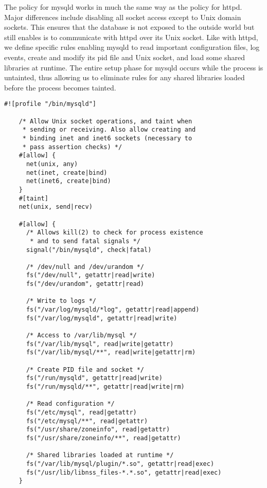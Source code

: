 The \bpfbox{} policy for mysqld works in much the same way as the policy for httpd. Major
differences include disabling all socket access except to Unix domain sockets. This
ensures that the database is not exposed to the outside world but still enables is to
communicate with httpd over its Unix socket. Like with httpd, we define specific rules
enabling mysqld to read important configuration files, log events, create and modify its
\gls{pid} file and Unix socket, and load some shared libraries at runtime. The entire
setup phase for mysqld occurs while the process is untainted, thus allowing us to
eliminate rules for any shared libraries loaded before the process becomes tainted.

\begin{lstlisting}[language=bpfbox, gobble=4, float=false, caption={[A \bpfbox{} policy for MySQL]
  A \bpfbox{} policy for MySQL.
  %\todo{Describe this}
}, label={lst:bpfbox-mysql}]
    #![profile "/bin/mysqld"]

    /* Allow Unix socket operations, and taint when
     * sending or receiving. Also allow creating and
     * binding inet and inet6 sockets (necessary to
     * pass assertion checks) */
    #[allow] {
      net(unix, any)
      net(inet, create|bind)
      net(inet6, create|bind)
    }
    #[taint]
    net(unix, send|recv)

    #[allow] {
      /* Allows kill(2) to check for process existence
       * and to send fatal signals */
      signal("/bin/mysqld", check|fatal)

      /* /dev/null and /dev/urandom */
      fs("/dev/null", getattr|read|write)
      fs("/dev/urandom", getattr|read)

      /* Write to logs */
      fs("/var/log/mysqld/*log", getattr|read|append)
      fs("/var/log/mysqld", getattr|read|write)

      /* Access to /var/lib/mysql */
      fs("/var/lib/mysql", read|write|getattr)
      fs("/var/lib/mysql/**", read|write|getattr|rm)

      /* Create PID file and socket */
      fs("/run/mysqld", getattr|read|write)
      fs("/run/mysqld/**", getattr|read|write|rm)

      /* Read configuration */
      fs("/etc/mysql", read|getattr)
      fs("/etc/mysql/**", read|getattr)
      fs("/usr/share/zoneinfo", read|getattr)
      fs("/usr/share/zoneinfo/**", read|getattr)

      /* Shared libraries loaded at runtime */
      fs("/var/lib/mysql/plugin/*.so", getattr|read|exec)
      fs("/usr/lib/libnss_files-*.*.so", getattr|read|exec)
    }
\end{lstlisting}

